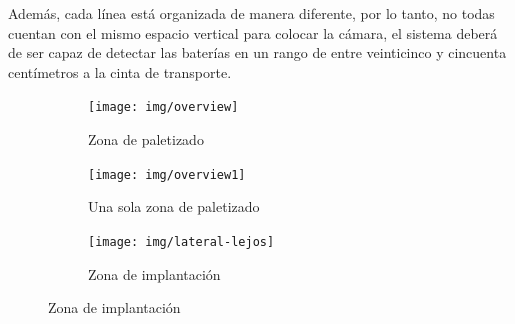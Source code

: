 \documentclass[11pt]{memoir}
\begin{document}
Además, cada línea está organizada de manera diferente, por lo tanto, no todas cuentan con el mismo espacio vertical para colocar la cámara, el sistema deberá de ser capaz de detectar las baterías en un rango de entre veinticinco y cincuenta centímetros a la cinta de transporte.

\begin{figure}[H]
\centering

\begin{subfigure}{0.3\textwidth}
\centering
  \texttt{[image: img/overview]}
  \caption{Zona de paletizado}
  \label{fig:palet-zone}
\end{subfigure}\hfill
\begin{subfigure}{0.3\textwidth}
\centering
  \texttt{[image: img/overview1]}
  \caption{Una sola zona de paletizado}
  \label{fig:palet-one}
\end{subfigure}\hfill
\begin{subfigure}{0.3\textwidth}
\centering
  \texttt{[image: img/lateral-lejos]}
  \caption{Zona de implantación}
  \label{fig:implantacion}
\end{subfigure}

\bigskip


\end{figure}
\end{document}
